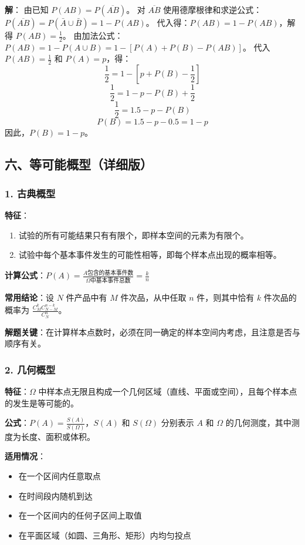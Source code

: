 \documentclass[12pt,a4paper]{ctexart}
\begin{document}
\textbf{解}：
由已知 $P(AB) = P(\overline{AB})$。
对 $\overline{AB}$ 使用德摩根律和求逆公式：$P(\overline{AB}) = P(\bar{A} \cup \bar{B}) = 1 - P(AB)$。
代入得：$P(AB) = 1 - P(AB)$，解得 $P(AB) = \frac{1}{2}$。
由加法公式：$P(AB) = 1 - P(A \cup B) = 1 - [P(A) + P(B) - P(AB)]$。
代入 $P(AB) = \frac{1}{2}$ 和 $P(A) = p$，得：
\[
    \frac{1}{2} = 1 - [p + P(B) - \frac{1}{2}]
\]
\[
    \frac{1}{2} = 1 - p - P(B) + \frac{1}{2}
\]
\[
    \frac{1}{2} = 1.5 - p - P(B)
\]
\[
    P(B) = 1.5 - p - 0.5 = 1 - p
\]
因此，$\boxed{P(B) = 1-p}$。

\subsection{六、等可能概型（详细版）}

\subsubsection{1. 古典概型}
\textbf{特征}：
\begin{enumerate}[noitemsep]
    \item 试验的所有可能结果只有有限个，即样本空间的元素为有限个。
    \item 试验中每个基本事件发生的可能性相等，即每个样本点出现的概率相等。
\end{enumerate}

\textbf{计算公式}：$\displaystyle P(A) = \frac{A\text{包含的基本事件数}}{\Omega\text{中基本事件总数}} = \frac{k}{n}$

\textbf{常用结论}：设 $N$ 件产品中有 $M$ 件次品，从中任取 $n$ 件，则其中恰有 $k$ 件次品的概率为 $\displaystyle \frac{C_M^k C_{N-M}^{n-k}}{C_N^n}$。

\textbf{解题关键}：在计算样本点数时，必须在同一确定的样本空间内考虑，且注意是否与顺序有关。

\subsubsection{2. 几何概型}
\textbf{特征}：$\Omega$ 中样本点无限且构成一个几何区域（直线、平面或空间），且每个样本点的发生是等可能的。

\textbf{公式}：$\displaystyle P(A) = \frac{S(A)}{S(\Omega)}$，$S(A)$ 和 $S(\Omega)$ 分别表示 $A$ 和 $\Omega$ 的几何测度，其中测度为长度、面积或体积。

\textbf{适用情况}：
\begin{itemize}[noitemsep]
    \item 在一个区间内任意取点
    \item 在时间段内随机到达
    \item 在一个区间内的任何子区间上取值
    \item 在平面区域（如圆、三角形、矩形）内均匀投点
\end{itemize}
\end{document}
